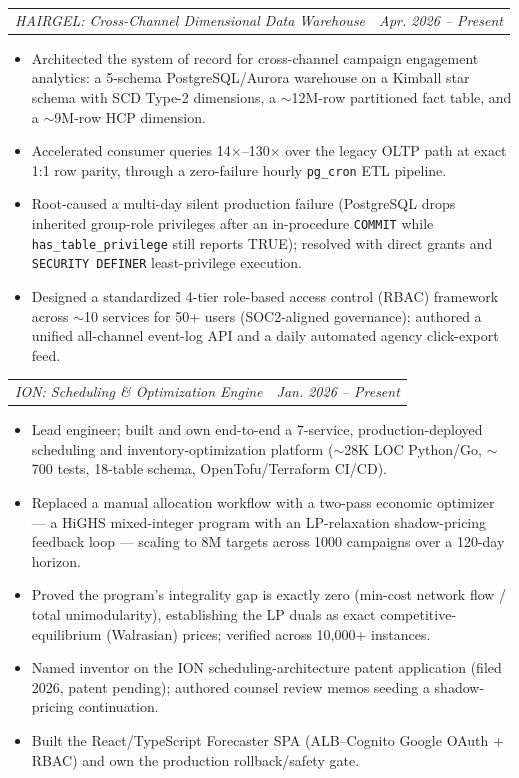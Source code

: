 \documentclass[letterpaper,11pt]{article}
\makeatletter
\newcommand{\resumeItem}[1]{
  \item\small{
    {#1 \vspace{-2pt}}
  }
}
\newcommand{\resumeSubSubheading}[2]{
    \item
    \begin{tabular*}{0.97\textwidth}{l@{\extracolsep{\fill}}r}
      \textit{\small#1} & \textit{\small #2} \\
    \end{tabular*}\vspace{-7pt}
}
\newcommand{\resumeItemListStart}{\begin{itemize}}
\newcommand{\resumeItemListEnd}{\end{itemize}\vspace{-5pt}}
\makeatother
\begin{document}
          \resumeSubSubheading{HAIRGEL: Cross-Channel Dimensional Data Warehouse}{Apr. 2026 -- Present}
          \resumeItemListStart
            \resumeItem{Architected the system of record for cross-channel campaign engagement analytics: a 5-schema PostgreSQL/Aurora warehouse on a Kimball star schema with SCD Type-2 dimensions, a $\sim$12M-row partitioned fact table, and a $\sim$9M-row HCP dimension.}
            \resumeItem{Accelerated consumer queries 14$\times$--130$\times$ over the legacy OLTP path at exact 1:1 row parity, through a zero-failure hourly \texttt{pg\_cron} ETL pipeline.}
            \resumeItem{Root-caused a multi-day silent production failure (PostgreSQL drops inherited group-role privileges after an in-procedure \texttt{COMMIT} while \texttt{has\_table\_privilege} still reports TRUE); resolved with direct grants and \texttt{SECURITY DEFINER} least-privilege execution.}
            \resumeItem{Designed a standardized 4-tier role-based access control (RBAC) framework across $\sim$10 services for 50+ users (SOC2-aligned governance); authored a unified all-channel event-log API and a daily automated agency click-export feed.}
          \resumeItemListEnd

          \resumeSubSubheading{ION: Scheduling \& Optimization Engine}{Jan. 2026 -- Present}
          \resumeItemListStart
            \resumeItem{Lead engineer; built and own end-to-end a 7-service, production-deployed scheduling and inventory-optimization platform ($\sim$28K LOC Python/Go, $\sim$700 tests, 18-table schema, OpenTofu/Terraform CI/CD).}
            \resumeItem{Replaced a manual allocation workflow with a two-pass economic optimizer --- a HiGHS mixed-integer program with an LP-relaxation shadow-pricing feedback loop --- scaling to 8M targets across 1000 campaigns over a 120-day horizon.}
            \resumeItem{Proved the program's integrality gap is exactly zero (min-cost network flow / total unimodularity), establishing the LP duals as exact competitive-equilibrium (Walrasian) prices; verified across 10,000+ instances.}
            \resumeItem{Named inventor on the ION scheduling-architecture patent application (filed 2026, patent pending); authored counsel review memos seeding a shadow-pricing continuation.}
            \resumeItem{Built the React/TypeScript Forecaster SPA (ALB--Cognito Google OAuth + RBAC) and own the production rollback/safety gate.}
          \resumeItemListEnd
\end{document}
